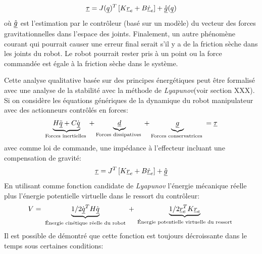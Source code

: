 \begin{align}
\underline{\tau} = J(\underline{q})^T   \left[ K \underline{r}_e + B \underline{\dot{r}}_e \right] + \underline{\hat{g}}(\underline{q})
\end{align} 
où $\underline{\hat{g}}$ est l'estimation par le contrôleur (basé sur un modèle) du vecteur des forces gravitationnelles dans l'espace des joints. Finalement, un autre phénomène courant qui pourrait causer une erreur final serait s'il y a de la friction sèche dans les joints du robot. Le robot pourrait rester pris à un point ou la force commandée est égale à la friction sèche dans le système.

Cette analyse qualitative basée sur des principes énergétiques peut être formalisé avec une analyse de la stabilité avec la méthode de \textit{Lyapunov}(voir section XXX). Si on considère les équations génériques de la dynamique du robot manipulateur avec des actionneurs contrôlés en forces:
\begin{align}
\underbrace{
H \ddot{\underline{q}} + C \dot{\underline{q}} 
}_{\text{Forces inertielles }}
+ 
\underbrace{
\underline{d}
}_{\text{Forces dissipatives }}
+ 
\underbrace{
\underline{g} 
}_{\text{Forces conservatrices }}
= \underline{\tau}
\end{align}
avec comme loi de commande, une impédance à l'effecteur incluant une compensation de gravité:
\begin{align}
\underline{\tau} = J^T   \left[ K \underline{r}_e + B \underline{\dot{r}}_e \right] + \underline{\hat{g}}
\end{align}
En utilisant comme fonction candidate de \textit{Lyapunov} l'énergie mécanique réelle plus l'énergie potentielle virtuelle dans le ressort du contrôleur:
\begin{align}
V = 
\underbrace{
1/2 \dot{\underline{q}}^T H \dot{\underline{q}} 
}_{\text{ Énergie cinétique réelle du robot }}
+
\underbrace{
1/2 \underline{r}_e^T K \underline{r}_e
}_{\text{ Énergie potentielle virtuelle du ressort }}
\end{align}
Il est possible de démontré que cette fonction est toujours décroissante dans le temps sous certaines conditions:
